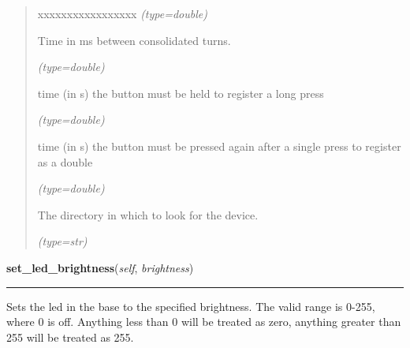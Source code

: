 \begin{boxedminipage}{\funcwidth}
\begin{quote}
\begin{Ventry}{xxxxxxxxxxxxxxxxx}
            {\it (type=double)}

          \item[turn\_delay]

          Time in ms between consolidated turns.

            {\it (type=double)}

          \item[long\_press\_time]

          time (in s) the button must be held to register a long press

            {\it (type=double)}

          \item[double\_click\_time]

          time (in s) the button must be pressed again after a single press
          to register as a double

            {\it (type=double)}

          \item[dev\_dir]

          The directory in which to look for the device.

            {\it (type=str)}

        \end{Ventry}

      \end{quote}

    \end{boxedminipage}

    \label{PowerMateEventHandler:PowerMateEventHandler:set_led_brightness}

    \vspace{0.5ex}

\hspace{.8\funcindent}\begin{boxedminipage}{\funcwidth}

    \raggedright \textbf{set\_led\_brightness}(\textit{self}, \textit{brightness})

    \vspace{-1.5ex}

    \rule{\textwidth}{0.5\fboxrule}
\setlength{\parskip}{2ex}
    Sets the led in the base to the specified brightness. The valid range 
    is 0-255, where 0 is off. Anything less than 0 will be treated as zero,
    anything greater than 255 will be treated as 255.

\setlength{\parskip}{1ex}
    \end{boxedminipage}

